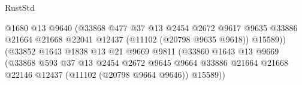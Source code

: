 \begin{lexlean}{RustStd}
\begin{coremodule}
                                                  @1680
                                                  @13
                                                  @9640
                                                  (@33868
                                                    @477
                                                    @37
                                                    @13
                                                    @2454
                                                    @2672
                                                    @9617
                                                    @9635
                                                    @33886
                                                    @21664
                                                    @21668
                                                    @22041
                                                    @12437
                                                    (@11102 (@20798 @9635 @9618))
                                                    @15589))
                                                (@33852
                                                  @1643
                                                  @1838
                                                  @13
                                                  @21
                                                  @9669
                                                  @9811
                                                  (@33860
                                                    @1643
                                                    @13
                                                    @9669
                                                    (@33868
                                                      @593
                                                      @37
                                                      @13
                                                      @2454
                                                      @2672
                                                      @9645
                                                      @9664
                                                      @33886
                                                      @21664
                                                      @21668
                                                      @22146
                                                      @12437
                                                      (@11102 (@20798 @9664 @9646))
                                                      @15589))

\end{coremodule}
\end{lexlean}
